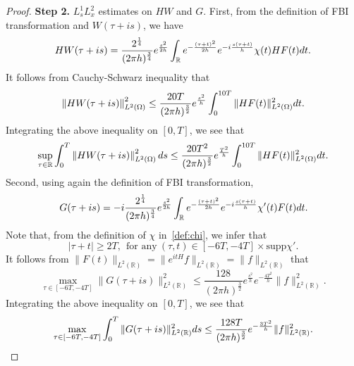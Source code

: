 \documentclass[a4paper,reqno]{amsart}
\theoremstyle{definition}
\numberwithin{equation}{section}
\newcommand{\R}{\mathbb{R}}
\def \R {{\mathbb{R} }}
\def \d {{\rm{d}}}
\begin{document}
\begin{proof}
\textbf{Step 2.} $L_{s}^{1}L_{x}^{2}$ estimates on $HW$ and $G$. First, from the definition of FBI transformation and $W(\tau+is)$, we have 
\begin{equation*}
    HW(\tau+is)=\frac{2^{\frac{1}{4}}}{(2\pi h)^{\frac{3}{4}}}e^{\frac{s^{2}}{2h}}\int_{\R}e^{-\frac{(\tau+t)^{2}}{2h}}e^{-i\frac{s(\tau+t)}{h}}\chi(t)HF(t)\d t.
\end{equation*}
It follows from Cauchy-Schwarz inequality that 
\begin{equation*}
    \left\|HW(\tau+is)\right\|_{L^{2}(\Omega)}^{2}\le \frac{20T}{(2\pi h)^{\frac{3}{2}}}e^{\frac{s^{2}}{h}}\int_{0}^{10T}\|HF(t)\|_{L^{2}(\Omega)}^{2}\d t.
\end{equation*}
Integrating the above inequality on $[0,T]$, we see that 
\begin{equation}\label{est:HW}
    \sup_{\tau\in \R}\int_{0}^{T}\left\|HW(\tau+is)\right\|_{L^{2}(\Omega)}^{2}\d s\le 
    \frac{20T^{2}}{(2\pi h)^{\frac{3}{2}}}e^{\frac{T^{2}}{h}}\int_{0}^{10T}\|HF(t)\|_{L^{2}(\Omega)}^{2}\d t.   \end{equation}
    Second, using again the definition of FBI transformation, 
    \begin{equation*}
        G(\tau+is)=-i\frac{2^{\frac{1}{4}}}{(2\pi h)^{\frac{3}{4}}}e^{\frac{s^{2}}{2h}}\int_{\R}e^{-\frac{(\tau+t)^{2}}{2h}}e^{-i\frac{s(\tau+t)}{h}}\chi'(t)F(t)\d t.   
        \end{equation*}
        Note that, from the definition of $\chi$ in~\eqref{def:chi}, we infer that 
        \begin{equation*}
            |\tau+t|\ge 2T,\ \  \mbox{for any}\ (\tau,t)\in [-6T,-4T]\times \mbox{supp}\chi'.
        \end{equation*}
        It follows from $\|F(t)\|_{L^{2}(\R)}=\|e^{itH}f\|_{L^{2}(\R)}=\|f\|_{L^{2}(\R)}$ that 
\begin{equation*}
    \max_{\tau\in [-6T,-4T]}\|G(\tau+is)\|_{L^{2}(\R)}^{2}\le \frac{128}{(2\pi h)^{\frac{3}{2}}}e^{\frac{s^{2}}{h}}e^{-\frac{4T^{2}}{h}}\|f\|_{L^{2}(\R)}^{2}.
\end{equation*}
Integrating the above inequality on $[0,T]$, we see that 
\begin{equation}\label{est:G}
    \max_{\tau \in [-6T,-4T]}\int_{0}^{T}\|G(\tau+is)\|_{L^{2}(\R)}^{2}\d s \le \frac{128T}{(2\pi h)^{\frac{3}{2}}}e^{-\frac{3T^{2}}{h}}\|f\|_{L^{2}(\R)}^{2}.
    \end{equation}
        

\end{proof}
\end{document}
